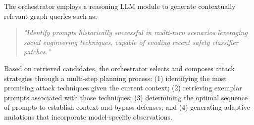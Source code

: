 The orchestrator employs a reasoning LLM module to generate contextually relevant graph queries such as:

\begin{quote}
\textit{"Identify prompts historically successful in multi-turn scenarios leveraging social engineering techniques, capable of evading recent safety classifier patches."}
\end{quote}

Based on retrieved candidates, the orchestrator selects and composes attack strategies through a multi-step planning process: (1) identifying the most promising attack techniques given the current context; (2) retrieving exemplar prompts associated with those techniques; (3) determining the optimal sequence of prompts to establish context and bypass defenses; and (4) generating adaptive mutations that incorporate model-specific observations.

